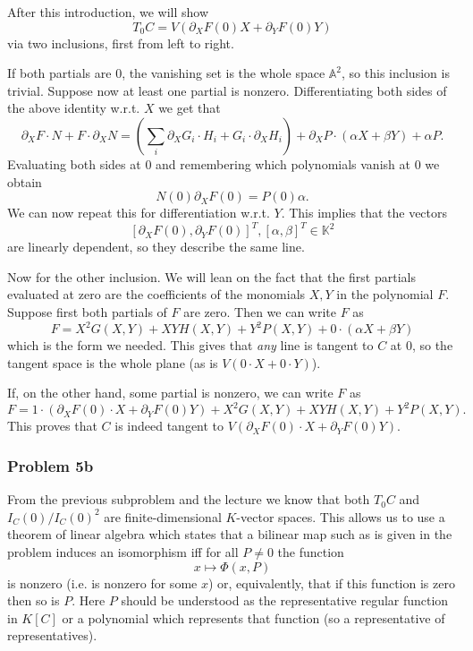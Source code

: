 After this introduction, we will show
\[ 
    T_0 C = V\left( \partial_X F (0) X + \partial_Y F(0) Y \right) 
\]
via two inclusions, first from left to right.

If both partials are \( 0 \), the vanishing set is the whole space \( \mathbb{A}^2 \),
so this inclusion is trivial. Suppose now at least one partial is nonzero.
Differentiating both sides of the above identity w.r.t. \( X \) we get that
\[ 
    \partial_X F \cdot N + F \cdot \partial_X N = \left( \sum_i \partial_X G_i \cdot H_i
    + G_i \cdot \partial_X H_i \right ) + \partial_X P \cdot (\alpha X + \beta Y) + \alpha P.
\]
Evaluating both sides at \( 0 \) and remembering which polynomials vanish at \( 0 \)
we obtain
\[ 
    N(0) \partial_X F (0) = P(0) \alpha.
\]
We can now repeat this for differentiation w.r.t. \( Y \). This implies that the
vectors
\[ 
    [ \partial_X F(0), \partial_Y F(0) ]^T, [ \alpha, \beta ]^T \in \mathbb{K}^2
\]
are linearly dependent, so they describe the same line.

Now for the other inclusion. We will lean on the fact that the first partials
evaluated at zero are the coefficients of the monomials \( X, Y \) in the polynomial \( F \).
Suppose first both partials of \( F \) are zero.
Then we can write \( F \) as
\[ 
    F = X^2G(X,Y) + XY H(X,Y) + Y^2 P(X,Y) + 0 \cdot (\alpha X + \beta Y)
\]
which is the form we needed. This gives that \textit{any} line is tangent to \( C \)
at \( 0 \), so the tangent space is the whole plane (as is \( V(0 \cdot X + 0 \cdot Y) \)).

If, on the other hand, some partial is nonzero, we can write \( F \) as
\[ 
    F = 1 \cdot (\partial_X F (0) \cdot X  + \partial_Y F(0) Y) + X^2G(X,Y) +
    XY H(X,Y) + Y^2 P(X,Y).
\]
This proves that \( C \) is indeed tangent to \( V(\partial_X F (0) \cdot X  +
\partial_Y F(0) Y)\).

\subsubsection*{Problem 5b}

From the previous subproblem and the lecture we know that both \( T_0 C \)
and \( I_C (0) / I_C(0)^2 \) are finite-dimensional \( K \)-vector spaces.
This allows us to use a theorem of linear algebra which states that a bilinear map
such as is given in the problem induces an isomorphism iff for all \( P \neq 0 \)
the function
\[ 
    x \mapsto \Phi(x, P)
\]
is nonzero (i.e. is nonzero for some \( x \)) or, equivalently, that if this 
function is zero then so is \( P \). Here \( P \) should be understood as the
representative regular function in \( K[C] \) or a polynomial which represents
that function (so a representative of representatives).

